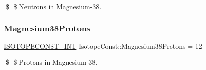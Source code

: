 \$ \$ Neutrons in Magnesium-\/38. \mbox{\label{group___isotope_const-_magnesium-_mg38_ga4fd68c4bd1ab9781c7dd7b41bd9eb3a9}} 
\subsubsection{\texorpdfstring{Magnesium38\+Protons}{Magnesium38Protons}}
{\footnotesize\ttfamily \mbox{\hyperlink{group___isotope_const-_macros_ga5f18360b3e99483a35c32d789e62621c}{I\+S\+O\+T\+O\+P\+E\+C\+O\+N\+S\+T\+\_\+\+I\+NT}} Isotope\+Const\+::\+Magnesium38\+Protons = 12}

\$ \$ Protons in Magnesium-\/38. 